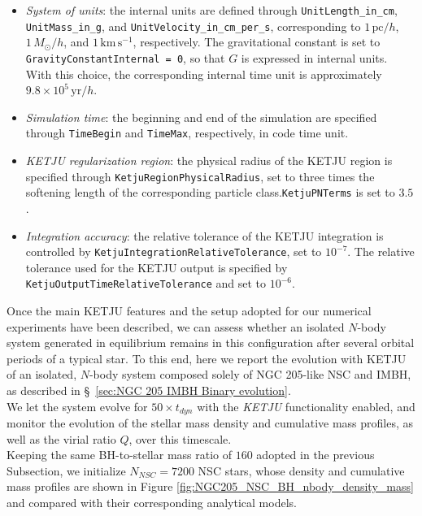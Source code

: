 \documentclass[12pt,twoside,openany]{book}
\begin{document}
\begin{itemize}
    \item \textit{System of units}: the internal units are defined through
    \texttt{UnitLength\_in\_cm}, \texttt{UnitMass\_in\_g}, and
    \texttt{UnitVelocity\_in\_cm\_per\_s}, corresponding to
    $1\,\mathrm{pc}/h$, $1\,M_\odot/h$, and $1\,\mathrm{km\,s^{-1}}$,
    respectively. The gravitational constant is set to
    \texttt{GravityConstantInternal = 0}, so that $G$ is expressed in internal
    units. With this choice, the corresponding internal time unit is
    approximately $9.8\times10^{5}\,\mathrm{yr}/h$.

    \item \textit{Simulation time}: the beginning and end of the simulation are
    specified through \texttt{TimeBegin} and \texttt{TimeMax}, respectively, in code time unit.

    \item \textit{KETJU regularization region}: the physical radius of the
    KETJU region is specified through \texttt{KetjuRegionPhysicalRadius}, set
    to three times the softening length of the corresponding particle class.\texttt{KetjuPNTerms} is set to $3.5$.

    \item \textit{Integration accuracy}: the relative tolerance of the KETJU
    integration is controlled by \texttt{KetjuIntegrationRelativeTolerance},
    set to $10^{-7}$. The relative tolerance used for the KETJU output is
    specified by \texttt{KetjuOutputTimeRelativeTolerance} and set to
    $10^{-6}$.
\end{itemize}
Once the main KETJU features and the setup adopted for our numerical experiments have been described, we can assess whether an isolated $N$-body system generated in equilibrium remains in this configuration after several orbital periods of a typical star. To this end, here we report the evolution with KETJU of an isolated, $N$-body system composed solely of NGC 205-like NSC and IMBH, as described in \S~\ref{sec:NGC 205 IMBH Binary evolution}.\\We let the system evolve for $50\times t_{dyn}$ with the \textit{KETJU} functionality enabled, and monitor the evolution of the stellar mass density and cumulative mass profiles, as well as the virial ratio $Q$, over this timescale.\\Keeping the same BH-to-stellar mass ratio of $160$ adopted in the previous Subsection, we initialize $N_{NSC}=7200$ NSC stars, whose density and cumulative mass profiles are shown in Figure \ref{fig:NGC205_NSC_BH_nbody_density_mass} and compared with their corresponding analytical models.
\end{document}
